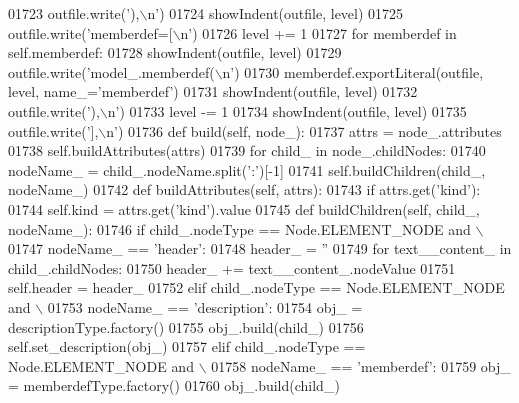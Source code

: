 \begin{DoxyCode}
{{{{{{{{{{{{{{{{{{{{{{{{{{{{{{{{{{{{{{{{{{{{{{{{{{{{{{{{{{{{{{{{{{{{{{{{{{{{{{{{{{{{{{{{{{{{{{{{{{{{{{{{{{{{{{{{{{01723             outfile.write(\textcolor{stringliteral}{'),\(\backslash\)n'})
01724         showIndent(outfile, level)
01725         outfile.write(\textcolor{stringliteral}{'memberdef=[\(\backslash\)n'})
01726         level += 1
01727         \textcolor{keywordflow}{for} memberdef \textcolor{keywordflow}{in} self.memberdef:
01728             showIndent(outfile, level)
01729             outfile.write(\textcolor{stringliteral}{'model\_.memberdef(\(\backslash\)n'})
01730             memberdef.exportLiteral(outfile, level, name\_=\textcolor{stringliteral}{'memberdef'})
01731             showIndent(outfile, level)
01732             outfile.write(\textcolor{stringliteral}{'),\(\backslash\)n'})
01733         level -= 1
01734         showIndent(outfile, level)
01735         outfile.write(\textcolor{stringliteral}{'],\(\backslash\)n'})
01736     \textcolor{keyword}{def }build(self, node\_):
01737         attrs = node\_.attributes
01738         self.buildAttributes(attrs)
01739         \textcolor{keywordflow}{for} child\_ \textcolor{keywordflow}{in} node\_.childNodes:
01740             nodeName\_ = child\_.nodeName.split(\textcolor{stringliteral}{':'})[-1]
01741             self.buildChildren(child\_, nodeName\_)
01742     \textcolor{keyword}{def }buildAttributes(self, attrs):
01743         \textcolor{keywordflow}{if} attrs.get(\textcolor{stringliteral}{'kind'}):
01744             self.kind = attrs.get(\textcolor{stringliteral}{'kind'}).value
01745     \textcolor{keyword}{def }buildChildren(self, child\_, nodeName\_):
01746         \textcolor{keywordflow}{if} child\_.nodeType == Node.ELEMENT\_NODE \textcolor{keywordflow}{and} \(\backslash\)
01747             nodeName\_ == \textcolor{stringliteral}{'header'}:
01748             header\_ = \textcolor{stringliteral}{''}
01749             \textcolor{keywordflow}{for} text\_\_content\_ \textcolor{keywordflow}{in} child\_.childNodes:
01750                 header\_ += text\_\_content\_.nodeValue
01751             self.header = header\_
01752         \textcolor{keywordflow}{elif} child\_.nodeType == Node.ELEMENT\_NODE \textcolor{keywordflow}{and} \(\backslash\)
01753             nodeName\_ == \textcolor{stringliteral}{'description'}:
01754             obj\_ = descriptionType.factory()
01755             obj\_.build(child\_)
01756             self.set_description(obj\_)
01757         \textcolor{keywordflow}{elif} child\_.nodeType == Node.ELEMENT\_NODE \textcolor{keywordflow}{and} \(\backslash\)
01758             nodeName\_ == \textcolor{stringliteral}{'memberdef'}:
01759             obj\_ = memberdefType.factory()
01760             obj\_.build(child\_)
}}}}}}}}}}}}}}}}}}}}}}}}}}}}}}}}}}}}}}}}}}}}}}}}}}}}}}}}}}}}}}}}}}}}}}}}}}}}}}}}}}}}}}}}}}}}}}}}}}}}}}}}}}}}}}}}}}
\end{DoxyCode}
